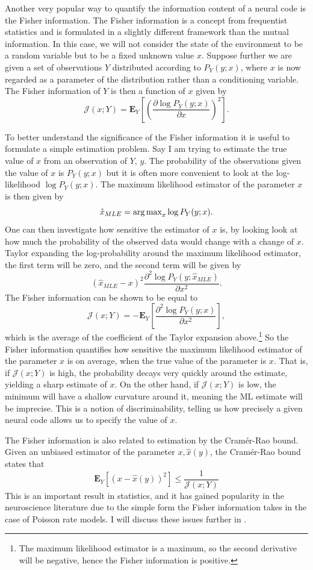 Another very popular way to quantify the information content of a neural code is the Fisher information. The Fisher information is a concept from frequentist
statistics and is formulated in a slightly different framework than the mutual information. In this case, we will not consider the state of the environment to be a random 
variable
but to be a fixed unknown value $x$. Suppose further we are given a set of observations $Y$ distributed according to $P_Y(y;x)$, where $x$ is now regarded as a
parameter of the distribution rather than a conditioning variable. The Fisher information of $Y$ is then a function of $x$ given by
\[
\mathcal{J}(x;Y) = \boldsymbol{E}_Y\left[\left(\frac{\partial \log P_Y(y;x)}{\partial x}\right)^2\right].
\]
\par
To better understand the significance of the Fisher information it is useful to formulate a simple estimation problem. Say I am trying to estimate the true
value of $x$ from an observation of $Y$, $y$. The probability of the observations given the value of $x$ is $P_Y(y;x)$ but
it is often more convenient to look at the log-likelihood $\log P_Y(y;x)$. The maximum likelihood estimator of the parameter $x$ is then given by
\[
\hat{x}_{MLE} = \operatorname{\arg\max}_x \log P_Y(y;x).
\]
One can then investigate how sensitive the estimator of $x$ is, by looking look at how much the probability of the observed data would change with a change of $x$. Taylor
expanding the log-probability around the maximum likelihood estimator, the first term will be zero, and the second term will be given by
\[
(\hat{x}_{MLE} - x)^2 \frac{\partial^2 \log P_Y(y;\hat{x}_{MLE})}{\partial x^2}.
\]
The Fisher information can be shown to be equal to
\[
\mathcal{J}(x;Y) =-\boldsymbol{E}_Y\left[\frac{\partial^2 \log P_Y(y;x)}{\partial x^2}\right],
\]
which is the average of the coefficient of the Taylor expansion above.\footnote{The maximum likelihood estimator is a maximum, so the second derivative will be negative, hence
the Fisher information is positive.} So the Fisher information quantifies how sensitive the maximum likelihood estimator of the parameter $x$
is on average, when the true value of the parameter is $x$. That is, if
$\mathcal{J}(x;Y)$ is high, the probability decays very quickly around the estimate, yielding a sharp estimate of $x$. On the other hand, if $\mathcal{J}(x;Y)$ is low,
the minimum will have a shallow curvature around it, meaning the ML estimate will be imprecise. This is a notion of discriminability, telling us how precisely a given 
neural code allows us to specify the value of $x$.\par
The Fisher information is also related to estimation by the Cram\'{e}r-Rao bound. Given an unbiased estimator of the parameter $x, \hat{x}(y)$, the Cram\'{e}r-Rao 
bound states that
\[
\boldsymbol{E}_Y\left[(x-\hat{x}(y))^2\right] \le \frac{1}{\mathcal{J}(x;Y)}
\]
This is an important result in statistics, and it has gained popularity in the neuroscience literature due to
the simple form the Fisher information takes in the case of Poisson rate models. I will discuss these issues further in .\par

